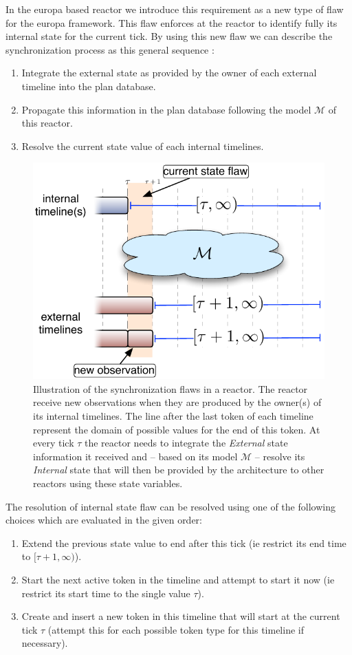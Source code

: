 In the europa based reactor we introduce this requirement as a new
type of flaw for the europa framework. This flaw enforces at the
reactor to identify fully its internal state for the current
tick. By using this new flaw we can describe the synchronization
process as this general sequence :
\begin{enumerate}
\item Integrate the external state as provided by the owner of each
  external timeline into the plan database.
\item Propagate this information in the plan database following the
  model $\mathcal{M}$ of this reactor.
\item Resolve the current state value of each internal timelines.
\end{enumerate}

\begin{figure}[!htbp]
  \centering
  \includegraphics[width=0.5\columnwidth]{figs/synch-relation}
  \caption{Illustration of the synchronization flaws in a reactor. The
    reactor receive new observations when they are produced by the
    owner(s) of its internal timelines. The line after the last token
    of each timeline represent the domain of possible values for the
    end of this token. At every tick $\tau$ the reactor needs to
    integrate the {\em External} state information it received and --
    based on its model $\mathcal{M}$ -- resolve its {\em Internal}
    state that will then be provided by the architecture to other
    reactors using these state variables.}
  \label{fig:synch:flaw}
\end{figure}

The resolution of internal state flaw can be resolved using one of the
following choices which are evaluated in the given order:
\begin{enumerate}
\item Extend the previous state value to end after this tick (ie
  restrict its end time to $[\tau+1, \infty)$). 
\item Start the next active token in the timeline and
  attempt to start it now (ie restrict its start time to the single
  value $\tau$).
\item Create and insert a new token in this timeline that will start
  at the current tick $\tau$ (attempt this for each possible token
  type for this timeline if necessary). 
\end{enumerate}

